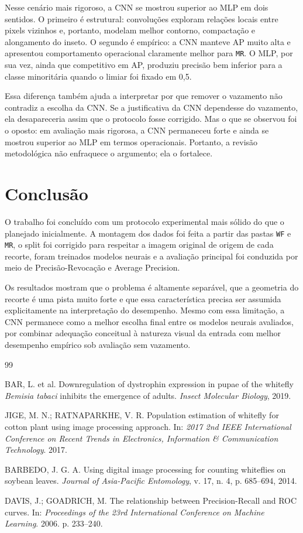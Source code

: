 \documentclass[12pt]{article}
\begin{document}
Nesse cenário mais rigoroso, a CNN se mostrou superior ao MLP em dois sentidos.
O primeiro é estrutural: convoluções exploram relações locais entre pixels
vizinhos e, portanto, modelam melhor contorno, compactação e alongamento do
inseto. O segundo é empírico: a CNN manteve AP muito alta e apresentou
comportamento operacional claramente melhor para \texttt{MR}. O MLP, por sua
vez, ainda que competitivo em AP, produziu precisão bem inferior para a classe
minoritária quando o limiar foi fixado em 0,5.

Essa diferença também ajuda a interpretar por que remover o vazamento não
contradiz a escolha da CNN. Se a justificativa da CNN dependesse do vazamento,
ela desapareceria assim que o protocolo fosse corrigido. Mas o que se observou
foi o oposto: em avaliação mais rigorosa, a CNN permaneceu forte e ainda se
mostrou superior ao MLP em termos operacionais. Portanto, a revisão
metodológica não enfraquece o argumento; ela o fortalece.

\section{Conclusão}

O trabalho foi concluído com um protocolo experimental mais sólido do que o
planejado inicialmente. A montagem dos dados foi feita a partir das pastas
\texttt{WF} e \texttt{MR}, o split foi corrigido para respeitar a imagem
original de origem de cada recorte, foram treinados modelos neurais e a
avaliação principal foi conduzida por meio de Precisão-Revocação e Average
Precision.

Os resultados mostram que o problema é altamente separável, que a geometria do
recorte é uma pista muito forte e que essa característica precisa ser assumida
explicitamente na interpretação do desempenho. Mesmo com essa limitação, a CNN
permanece como a melhor escolha final entre os modelos neurais avaliados, por
combinar adequação conceitual à natureza visual da entrada com melhor
desempenho empírico sob avaliação sem vazamento.

\begin{thebibliography}{99}

BAR, L. et al. Downregulation of dystrophin expression in pupae of the
whitefly \textit{Bemisia tabaci} inhibits the emergence of adults.
\textit{Insect Molecular Biology}, 2019.

JIGE, M. N.; RATNAPARKHE, V. R. Population estimation of whitefly for cotton
plant using image processing approach. In: \textit{2017 2nd IEEE International
Conference on Recent Trends in Electronics, Information \& Communication
Technology}. 2017.

BARBEDO, J. G. A. Using digital image processing for counting whiteflies on
soybean leaves. \textit{Journal of Asia-Pacific Entomology}, v. 17, n. 4,
p. 685--694, 2014.

DAVIS, J.; GOADRICH, M. The relationship between Precision-Recall and ROC
curves. In: \textit{Proceedings of the 23rd International Conference on Machine
Learning}. 2006. p. 233--240.

\end{thebibliography}
\end{document}
